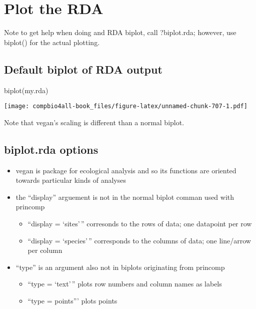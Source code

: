 \documentclass[
]{book}
\newenvironment{Shaded}{\begin{snugshade}}{\end{snugshade}}
\newcommand{\FunctionTok}[1]{\textcolor[rgb]{0.00,0.00,0.00}{#1}}
\newcommand{\NormalTok}[1]{#1}
\providecommand{\tightlist}{%
  \setlength{\itemsep}{0pt}\setlength{\parskip}{0pt}}
\begin{document}
\hypertarget{plot-the-rda}{%
\section{Plot the RDA}\label{plot-the-rda}}

Note to get help when doing and RDA biplot, call ?biplot.rda; however, use biplot() for the actual plotting.

\hypertarget{default-biplot-of-rda-output}{%
\subsection{Default biplot of RDA output}\label{default-biplot-of-rda-output}}

\begin{Shaded}
\begin{Highlighting}[]
\FunctionTok{biplot}\NormalTok{(my.rda)}
\end{Highlighting}
\end{Shaded}

\texttt{[image: compbio4all-book\_files/figure-latex/unnamed-chunk-707-1.pdf]}

Note that vegan's scaling is different than a normal biplot.

\hypertarget{biplot.rda-options}{%
\subsection{biplot.rda options}\label{biplot.rda-options}}

\begin{itemize}
\tightlist
\item
  vegan is package for ecological analysis and so its functions are oriented towards particular kinds of analyses
\item
  the ``display'' arguement is not in the normal biplot comman used with princomp

  \begin{itemize}
  \tightlist
  \item
    ``display = `sites'\,'' corresonds to the rows of data; one datapoint per row
  \item
    ``display = `species'\,'' corresponds to the columns of data; one line/arrow per column
  \end{itemize}
\item
  ``type'' is an argument also not in biplots originating from princomp

  \begin{itemize}
  \tightlist
  \item
    ``type = `text'\,'' plots row numbers and column names as labels
  \item
    ``type = points''' plots points
  \end{itemize}
\end{itemize}
\end{document}
